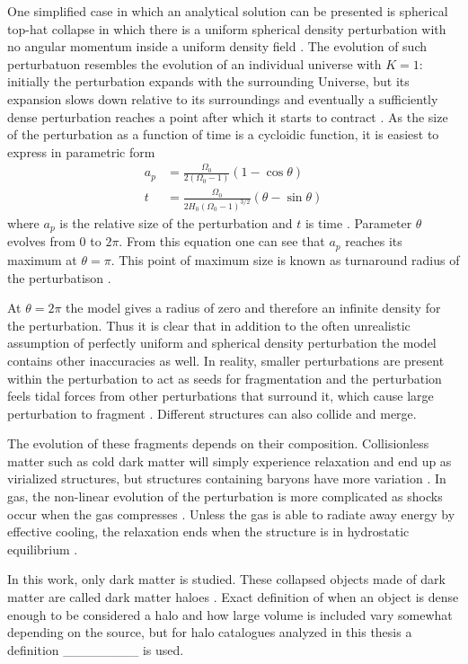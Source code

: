 \documentclass[english, oneside]{HYgradu}
\begin{document}
One simplified case in which an analytical solution can be presented is spherical top-hat collapse in which there is a uniform spherical density perturbation with no angular momentum inside a uniform density field \citep{longair2008galaxy}. The evolution of such perturbatuon resembles the evolution of an individual universe with $K = 1$: initially the perturbation expands with the surrounding Universe, but its expansion slows down relative to its surroundings and eventually a sufficiently dense perturbation reaches a point after which it starts to contract \citep{longair2008galaxy}. As the size of the perturbation as a function of time is a cycloidic function, it is easiest to express in parametric form
\begin{align}
a_p &= \frac{\Omega_0}{2(\Omega_0-1)}(1-\cos\theta) \\
t &= \frac{\Omega_0}{2H_0(\Omega_0-1)^{3/2}}(\theta - \sin\theta)
\end{align}
where $a_p$ is the relative size of the perturbation and $t$ is time \citep{longair2008galaxy}. Parameter $\theta$ evolves from 0 to $2\pi$. From this equation one can see that $a_p$ reaches its maximum at $\theta = \pi$. This point of maximum size is known as turnaround radius of the perturbatison \citep{mo2010galaxy}.

At $\theta = 2\pi$ the model gives a radius of zero and therefore an infinite density for the perturbation. Thus it is clear that in addition to the often unrealistic assumption of perfectly uniform and spherical density perturbation the model contains other inaccuracies as well. In reality, smaller perturbations are present within the perturbation to act as seeds for fragmentation and the perturbation feels tidal forces from other perturbations that surround it, which cause large perturbation to fragment \citep{longair2008galaxy}. Different structures can also collide and merge.

The evolution of these fragments depends on their composition. Collisionless matter such as cold dark matter will simply experience relaxation and end up as virialized structures, but structures containing baryons have more variation \citep{mo2010galaxy}. In gas, the non-linear evolution of the perturbation is more complicated as shocks occur when the gas compresses \citep{mo2010galaxy}. Unless the gas is able to radiate away energy by effective cooling, the relaxation ends when the structure is in hydrostatic equilibrium \citep{mo2010galaxy}.

In this work, only dark matter is studied. These collapsed objects made of dark matter are called dark matter haloes \citep{mo2010galaxy}. Exact definition of when an object is dense enough to be considered a halo and how large volume is included vary somewhat depending on the source, but for halo catalogues analyzed in this thesis a definition \_\_\_\_\_\_\_\_ is used. %
\end{document}
